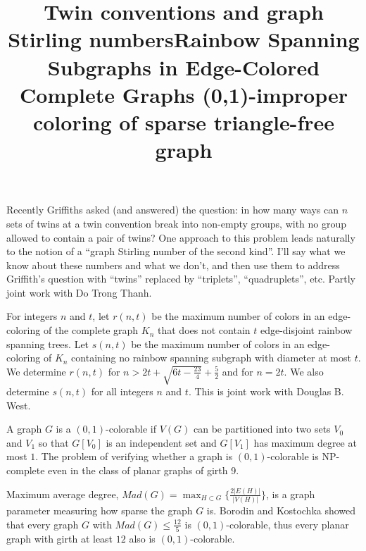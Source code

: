 \documentclass{article}
\begin{document}
\vspace{.25in}

\title{Twin conventions and graph Stirling numbers}
\endtitle
Recently Griffiths asked (and answered) the question: in how many
ways can $n$ sets of twins at a twin convention break into non-empty groups,
with no group allowed to contain a pair of twins? One approach to this
problem leads naturally to the notion of a ``graph Stirling number of the
second kind''. I'll say what we know about these numbers and what we don't,
and then use them to address Griffith's question with ``twins'' replaced by
``triplets'', ``quadruplets'', etc. Partly joint work with Do Trong Thanh.

\vspace{.25in}

\title{Rainbow Spanning Subgraphs in Edge-Colored Complete Graphs}
\endtitle
For integers $n$ and $t$, let $r(n,t)$ be the maximum number of
colors in an
edge-coloring of the complete graph $K_n$ that does not contain $t$
edge-disjoint rainbow spanning trees.  Let $s(n,t)$ be the maximum number of
colors in an edge-coloring of $K_n$ containing no rainbow spanning subgraph
with diameter at most $t$.  We determine $r(n,t)$ for
$n>2t+\sqrt{6t-\frac{23}{4}}+\frac52$ and for $n=2t$. We also determine
$s(n,t)$ for all integers $n$ and $t$. 
This is joint work with Douglas B. West. 




\vspace{.25in}

\title{ (0,1)-improper coloring of sparse triangle-free graph}
\endtitle
A graph $G$ is a $(0,1)$-colorable if $V(G)$ can be partitioned into two sets $V_0$ and $V_1$ so that $G[V_0]$ is an independent set and $G[V_1]$ has maximum degree at most $1$. The problem of verifying whether a graph is $(0,1)$-colorable is NP-complete even in the class of planar graphs of girth 9.

Maximum average degree, $Mad(G)= \max_{H\subset G}\{\frac{2|E(H)|}{|V(H)|}\}$, is a graph parameter measuring how sparse the  graph $G$ is. Borodin and Kostochka showed that every graph $G$ with $Mad(G)\leq \frac{12}{5}$ is $(0,1)$-colorable, thus every planar graph with girth at least $12$ also is $(0,1)$-colorable.
\end{document}
